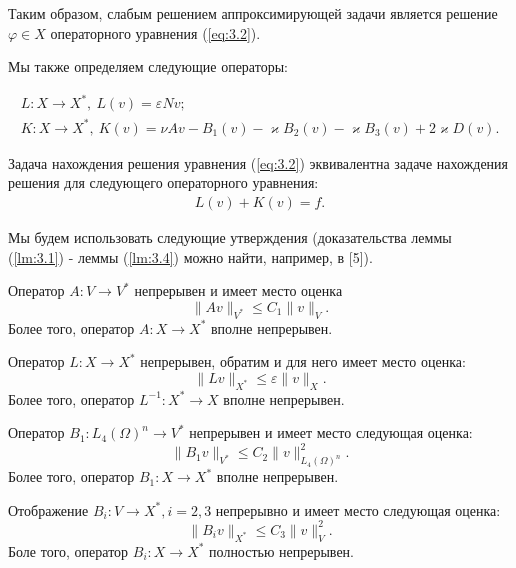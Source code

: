 Таким образом, слабым решением аппроксимирующей задачи является решение $\varphi \in X$ операторного уравнения (\ref{eq:3.2}).

Мы также определяем следующие операторы:

\begin{equation*}
    \begin{gathered}
        L: X \rightarrow X^*, \ L(v) = \varepsilon N v; \\
        K: X \rightarrow X^*, \ K(v) = \nu A v - B_1(v) - \varkappa B_2(v) - \varkappa B_3(v) + 2 \varkappa D(v).
    \end{gathered}
\end{equation*}

Задача нахождения решения уравнения (\ref{eq:3.2}) эквивалентна задаче нахождения решения для следующего операторного уравнения:
\begin{equation}\label{eq:3.3}
    \begin{gathered}
        L(v)+K(v)=f.
    \end{gathered}
\end{equation}

Мы будем использовать следующие утверждения (доказательства леммы (\ref{lm:3.1}) - леммы (\ref{lm:3.4}) можно найти, например, в [5]).
\begin{lemma}\label{lm:3.1}
    Оператор $A:V\rightarrow V^*$ непрерывен и имеет место оценка 
    $$\parallel Av\parallel_{V^*}\leqslant C_1\parallel v\parallel_V.$$
    Более того, оператор $A:X\rightarrow X^*$ вполне непрерывен.
\end{lemma}

\begin{lemma}\label{lm:3.2}
    Оператор $L:X\rightarrow X^*$ непрерывен, обратим и для него имеет место оценка:
    $$\parallel Lv\parallel_{X^*}\leqslant\varepsilon\parallel v\parallel_X.$$
    Более того, оператор $L^{-1}:X^*\rightarrow X$ вполне непрерывен.
\end{lemma}

\begin{lemma}\label{lm:3.3}
    Оператор $B_1:L_4(\Omega)^n \rightarrow V^*$ непрерывен и имеет место следующая оценка:
    $$\parallel B_1v\parallel_{V^*}\leqslant C_2\parallel v\parallel^2_{L_4(\Omega)^n}.$$
    Более того, оператор $B_1:X\rightarrow X^*$ вполне непрерывен.
\end{lemma}

\begin{lemma}\label{lm:3.4}
    Отображение $B_i:V\rightarrow X^*, i=2,3$ непрерывно и имеет место следующая оценка:
    $$\parallel B_iv\parallel_{X^*}\leqslant C_3\parallel v\parallel^2_V.$$
    Боле того, оператор $B_i:X\rightarrow X^*$ полностью непрерывен.
\end{lemma}

